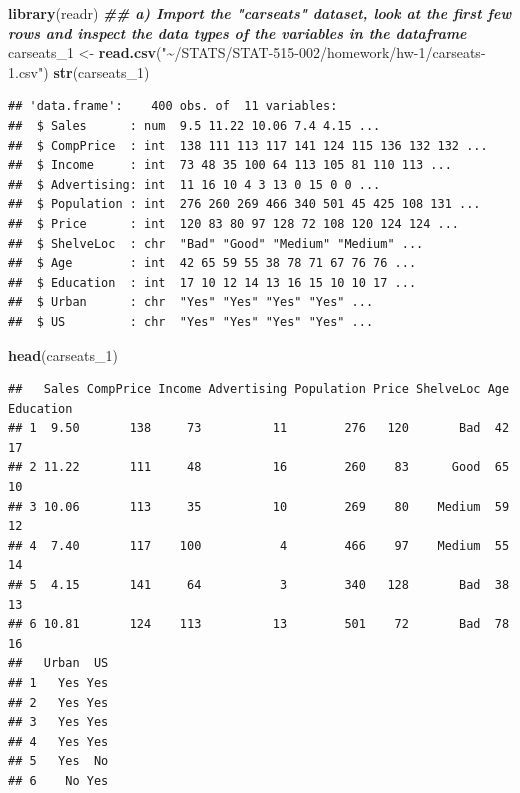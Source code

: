 \documentclass[
]{article}
\newenvironment{Shaded}{\begin{snugshade}}{\end{snugshade}}
\newcommand{\DocumentationTok}[1]{\textcolor[rgb]{0.56,0.35,0.01}{\textbf{\textit{#1}}}}
\newcommand{\FunctionTok}[1]{\textcolor[rgb]{0.13,0.29,0.53}{\textbf{#1}}}
\newcommand{\NormalTok}[1]{#1}
\newcommand{\OtherTok}[1]{\textcolor[rgb]{0.56,0.35,0.01}{#1}}
\newcommand{\StringTok}[1]{\textcolor[rgb]{0.31,0.60,0.02}{#1}}
\begin{document}
\begin{Shaded}
\begin{Highlighting}[]
\FunctionTok{library}\NormalTok{(readr)}
\DocumentationTok{\#\# a) Import the "carseats" dataset, look at the first few rows and inspect the data types of the variables in the dataframe}
\NormalTok{carseats\_1 }\OtherTok{\textless{}{-}} \FunctionTok{read.csv}\NormalTok{(}\StringTok{"\textasciitilde{}/STATS/STAT{-}515{-}002/homework/hw{-}1/carseats{-}1.csv"}\NormalTok{)}
\FunctionTok{str}\NormalTok{(carseats\_1)}
\end{Highlighting}
\end{Shaded}

\begin{verbatim}
## 'data.frame':    400 obs. of  11 variables:
##  $ Sales      : num  9.5 11.22 10.06 7.4 4.15 ...
##  $ CompPrice  : int  138 111 113 117 141 124 115 136 132 132 ...
##  $ Income     : int  73 48 35 100 64 113 105 81 110 113 ...
##  $ Advertising: int  11 16 10 4 3 13 0 15 0 0 ...
##  $ Population : int  276 260 269 466 340 501 45 425 108 131 ...
##  $ Price      : int  120 83 80 97 128 72 108 120 124 124 ...
##  $ ShelveLoc  : chr  "Bad" "Good" "Medium" "Medium" ...
##  $ Age        : int  42 65 59 55 38 78 71 67 76 76 ...
##  $ Education  : int  17 10 12 14 13 16 15 10 10 17 ...
##  $ Urban      : chr  "Yes" "Yes" "Yes" "Yes" ...
##  $ US         : chr  "Yes" "Yes" "Yes" "Yes" ...
\end{verbatim}

\begin{Shaded}
\begin{Highlighting}[]
\FunctionTok{head}\NormalTok{(carseats\_1)}
\end{Highlighting}
\end{Shaded}

\begin{verbatim}
##   Sales CompPrice Income Advertising Population Price ShelveLoc Age Education
## 1  9.50       138     73          11        276   120       Bad  42        17
## 2 11.22       111     48          16        260    83      Good  65        10
## 3 10.06       113     35          10        269    80    Medium  59        12
## 4  7.40       117    100           4        466    97    Medium  55        14
## 5  4.15       141     64           3        340   128       Bad  38        13
## 6 10.81       124    113          13        501    72       Bad  78        16
##   Urban  US
## 1   Yes Yes
## 2   Yes Yes
## 3   Yes Yes
## 4   Yes Yes
## 5   Yes  No
## 6    No Yes
\end{verbatim}
\end{document}

